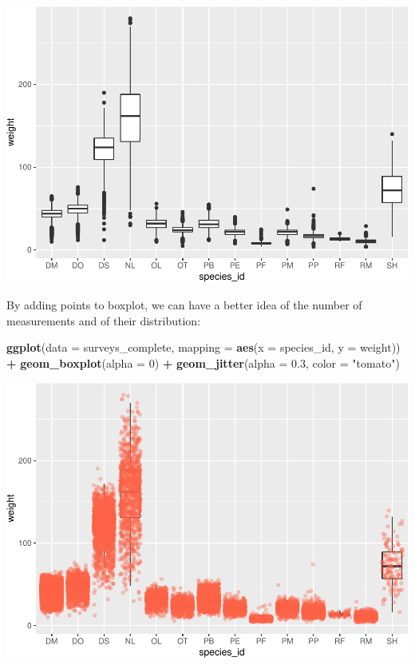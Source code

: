 \documentclass[]{book}
\newenvironment{Shaded}{\begin{snugshade}}{\end{snugshade}}
\newcommand{\KeywordTok}[1]{\textcolor[rgb]{0.13,0.29,0.53}{\textbf{#1}}}
\newcommand{\DataTypeTok}[1]{\textcolor[rgb]{0.13,0.29,0.53}{#1}}
\newcommand{\DecValTok}[1]{\textcolor[rgb]{0.00,0.00,0.81}{#1}}
\newcommand{\FloatTok}[1]{\textcolor[rgb]{0.00,0.00,0.81}{#1}}
\newcommand{\StringTok}[1]{\textcolor[rgb]{0.31,0.60,0.02}{#1}}
\newcommand{\OperatorTok}[1]{\textcolor[rgb]{0.81,0.36,0.00}{\textbf{#1}}}
\newcommand{\NormalTok}[1]{#1}
\begin{document}
\includegraphics{img/R-ecology-boxplot-1.pdf}

By adding points to boxplot, we can have a better idea of the number of
measurements and of their distribution:

\begin{Shaded}
\begin{Highlighting}[]
\KeywordTok{ggplot}\NormalTok{(}\DataTypeTok{data =}\NormalTok{ surveys_complete, }\DataTypeTok{mapping =} \KeywordTok{aes}\NormalTok{(}\DataTypeTok{x =}\NormalTok{ species_id, }\DataTypeTok{y =}\NormalTok{ weight)) }\OperatorTok{+}
\StringTok{    }\KeywordTok{geom_boxplot}\NormalTok{(}\DataTypeTok{alpha =} \DecValTok{0}\NormalTok{) }\OperatorTok{+}
\StringTok{    }\KeywordTok{geom_jitter}\NormalTok{(}\DataTypeTok{alpha =} \FloatTok{0.3}\NormalTok{, }\DataTypeTok{color =} \StringTok{"tomato"}\NormalTok{)}
\end{Highlighting}
\end{Shaded}

\includegraphics{img/R-ecology-boxplot-with-points-1.pdf}
\end{document}
